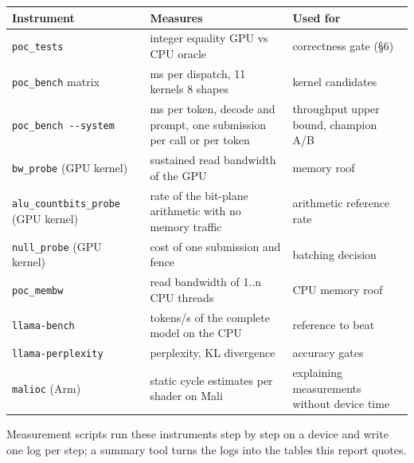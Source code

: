 \documentclass[
  10pt,
]{article}
\newcounter{none} %
\begin{document}
{\def\LTcaptype{none} %
\begin{longtable}[]{@{}
  >{\raggedright\arraybackslash}p{}
  >{\raggedright\arraybackslash}p{}
  >{\raggedright\arraybackslash}p{}@{}}
\toprule\noalign{}
\begin{minipage}[b]{\linewidth}\raggedright%
Instrument
\end{minipage} & \begin{minipage}[b]{\linewidth}\raggedright%
Measures
\end{minipage} & \begin{minipage}[b]{\linewidth}\raggedright%
Used for
\end{minipage} \\
\midrule\noalign{}
\endhead%
\bottomrule\noalign{}
\endlastfoot%
\texttt{poc\_tests} & integer equality GPU vs CPU oracle & correctness
gate (\S{}6) \\
\texttt{poc\_bench} matrix & ms per dispatch, 11 kernels \texttimes{} 8 shapes &
kernel candidates \\
\texttt{poc\_bench\ -{}-system} & ms per token, decode and prompt, one
submission per call or per token & throughput upper bound, champion
A/B \\
\texttt{bw\_probe} (GPU kernel) & sustained read bandwidth of the GPU &
memory roof \\
\texttt{alu\_countbits\_probe} (GPU kernel) & rate of the bit-plane
arithmetic with no memory traffic & arithmetic reference rate \\
\texttt{null\_probe} (GPU kernel) & cost of one submission and fence &
batching decision \\
\texttt{poc\_membw} & read bandwidth of 1..n CPU threads & CPU memory
roof \\
\texttt{llama-bench} & tokens/s of the complete model on the CPU &
reference to beat \\
\texttt{llama-perplexity} & perplexity, KL divergence & accuracy
gates \\
\texttt{malioc} (Arm) & static cycle estimates per shader on Mali &
explaining measurements without device time \\
\end{longtable}
}

Measurement scripts run these instruments step by step on a device and
write one log per step; a summary tool turns the logs into the tables
this report quotes.
\end{document}
